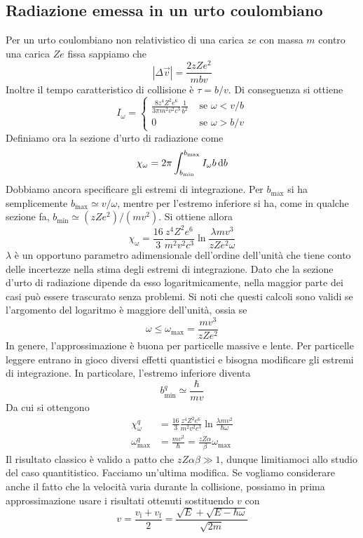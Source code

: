 \documentclass{article}
\begin{document}
\subsection{Radiazione emessa in un urto coulombiano}
Per un urto coulombiano non relativistico di una carica $ze$ con massa $m$ contro una carica $Ze$ fissa sappiamo che
\[|\Delta\vec{v}|=\frac{2zZe^2}{mbv}\]
Inoltre il tempo caratteristico di collisione è $\tau=b/v$. Di conseguenza si ottiene
\[I_\omega=\begin{cases}
\frac{8z^4Z^2e^6}{3\pi m^2v^2c^3}\frac{1}{b^2}&\textrm{ se }\omega<v/b\\0&\textrm{ se }\omega>b/v\end{cases}\]
Definiamo ora la sezione d'urto di radiazione come
\[\chi_\omega=2\pi\int_{b_\textrm{min}}^{b_\textrm{max}}I_\omega b\,\mathrm{d} b\]
Dobbiamo ancora specificare gli estremi di integrazione. Per $b_\textrm{max}$ si ha semplicemente $b_\textrm{max}\simeq v/\omega$, mentre per l'estremo inferiore si ha, come in qualche sezione fa, $b_\textrm{min}\simeq(zZe^2)/(mv^2)$. Si ottiene allora
\[\chi_\omega=\frac{16}{3}\frac{z^4Z^2e^6}{m^2v^2c^3}\ln\frac{\lambda mv^3}{zZe^2\omega}\]
$\lambda$ è un opportuno parametro adimensionale dell'ordine dell'unità che tiene conto delle incertezze nella stima degli estremi di integrazione. Dato che la sezione d'urto di radiazione dipende da esso logaritmicamente, nella maggior parte dei casi può essere trascurato senza problemi. Si noti che questi calcoli sono validi se l'argomento del logaritmo è maggiore dell'unità, ossia se
\[\omega\leq\omega_\textrm{max}=\frac{mv^3}{zZe^2}\]
In genere, l'approssimazione è buona per particelle massive e lente. Per particelle leggere entrano in gioco diversi effetti quantistici e bisogna modificare gli estremi di integrazione. In particolare, l'estremo inferiore diventa
\[b_\textrm{min}^q\simeq\frac{\hbar}{mv}\]
Da cui si ottengono
\begin{align*}
	\chi_\omega^q&=\frac{16}{3}\frac{z^4Z^2e^6}{m^2v^2c^3}\ln\frac{\lambda mv^2}{\hbar\omega}\\\omega_\textrm{max}^q&=\frac{mv^2}{\hbar}=\frac{zZ\alpha}{\beta}\omega_\textrm{max}
\end{align*}
Il risultato classico è valido a patto che $zZ\alpha\beta\gg1$, dunque limitiamoci allo studio del caso quantitistico. Facciamo un'ultima modifica. Se vogliamo considerare anche il fatto che la velocità varia durante la collisione, possiamo in prima approssimazione usare i risultati ottenuti sostituendo $v$ con
\[v=\frac{v_\textrm{i}+v_\textrm{f}}{2}=\frac{\sqrt{E}+\sqrt{E-\hbar\omega}}{\sqrt{2m}}\]
\end{document}
